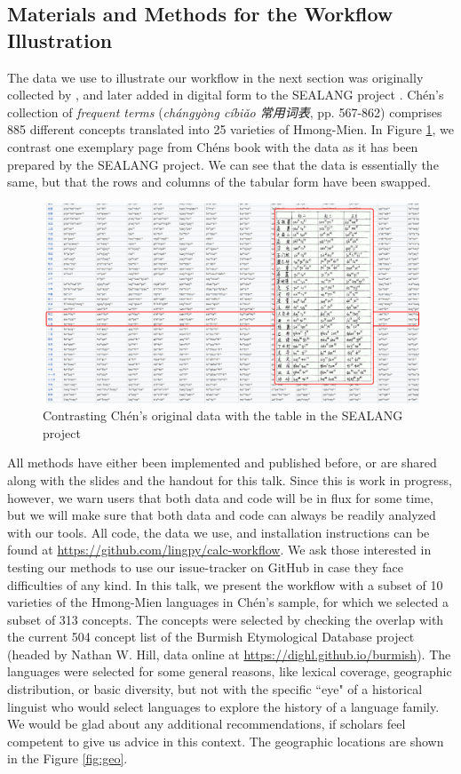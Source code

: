 \documentclass[xetex,svgnames]{scrartcl}
\begin{document}
\subsection{Materials and Methods for the Workflow Illustration}

The data we use to illustrate our workflow in the next section was originally collected by
\citet{Chen2012}, and later added in digital form to the SEALANG project \citep{Cooper2014,Sealang2005}. Chén's collection of
\emph{frequent terms} (\emph{chángyòng cíbiǎo 常用词表}, pp. 567-862) comprises 885 different
concepts translated into 25 varieties of Hmong-Mien. In Figure \ref{fig:data}, we contrast one
exemplary page from Chéns book with the data as it has been prepared by the SEALANG project\citep{Cooper2014,Sealang2005}.
We can see that the data is essentially the same, but that the rows and columns of the tabular form
have been swapped.

\begin{figure}[htb]
  \centering
  \includegraphics[width=\textwidth]{chen-illustration.pdf}
  \caption{Contrasting Chén's original data with the table in the SEALANG project}
  \label{fig:data}
\end{figure}

All methods have either been implemented and published before, or are shared along with the slides
and the handout for this talk. Since this is work in progress, however, we warn users that both data
and code will be in flux for some time, but we will make sure that both data and code can always be
readily analyzed with our tools. All code, the data we use, and installation instructions can be
found at \url{https://github.com/lingpy/calc-workflow}. We ask those interested in testing our
methods to use our issue-tracker on GitHub in case they face difficulties of any kind.
In this talk, we present the workflow with a subset of 10 varieties of the Hmong-Mien languages in
Chén's sample, for which we selected a subset of 313 concepts. The concepts were selected by
checking the overlap with the current 504 concept list of the Burmish Etymological Database project
(headed by Nathan W. Hill, data online at \url{https://dighl.github.io/burmish}).
The languages were selected for some general reasons, like lexical coverage, geographic
distribution, or basic diversity, but not with the specific ``eye" of a historical linguist who
would select languages to explore the history of a language family. We would be glad about any additional
recommendations, if scholars feel competent to give us advice in this context.
The
geographic locations are shown in the Figure \ref{fig:geo}.
\end{document}
